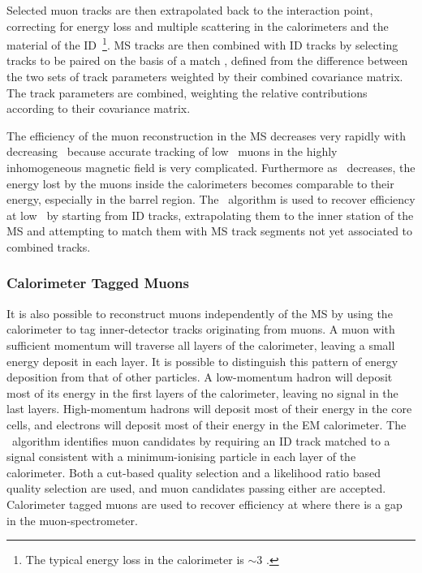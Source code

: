 Selected muon tracks are then extrapolated back to the interaction point,
correcting for energy loss and multiple scattering in the calorimeters and the
material of the ID~\footnote{The typical energy loss in the calorimeter is $\sim
3$ \GeV.}. MS tracks are then combined with ID tracks by selecting tracks to be
paired on the basis of a match \chisquared, defined from the difference between
the two sets of track parameters weighted by their combined covariance matrix.
The track parameters are combined, weighting the relative contributions
according to their covariance matrix.

The efficiency of the muon reconstruction in the MS decreases very rapidly with
decreasing \pt\ because accurate tracking of low \pt\ muons in the highly
inhomogeneous magnetic field is very complicated.
Furthermore as \pt\ decreases, the energy lost by the muons inside the
calorimeters becomes comparable to their energy, especially in the barrel
region. The \mutag\ algorithm is used to recover efficiency at low \pt\ by
starting from ID tracks, extrapolating them to the inner station of the MS and
attempting to match them with MS track segments not yet associated to combined
tracks.

\subsubsection{Calorimeter Tagged Muons}

It is also possible to reconstruct muons independently of the MS by using the
calorimeter to tag inner-detector tracks originating from muons.  A muon with
sufficient momentum will traverse all layers of the calorimeter, leaving a small
energy deposit in each layer. It is possible to distinguish this pattern of
energy deposition from that of other particles. A low-momentum hadron will
deposit most of its energy in the first layers of the calorimeter, leaving no
signal in the last layers. High-momentum hadrons will deposit most of their
energy in the core cells, and electrons will deposit most of their energy in the
EM calorimeter. The \CaloTrkMuID\ algorithm identifies muon candidates by
requiring an ID track matched to a signal consistent with a
minimum-ionising particle in each layer of the calorimeter. 
Both a cut-based quality selection and a likelihood ratio based quality
selection are used, and muon candidates passing either are accepted. Calorimeter
tagged muons are used to recover efficiency at  where there is a
gap in the muon-spectrometer.

